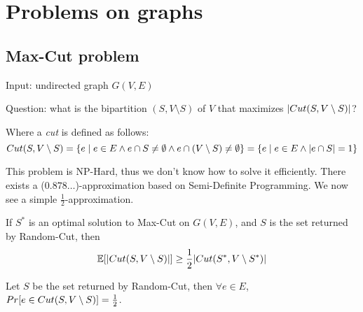 \section{Problems on graphs}\label{sec:problems_graphs}

\def\cut{Cut(S, V \setminus S)}
\subsection{Max-Cut problem}\label{subsec:maxcut}
    Input: undirected graph $G(V,E)$

    Question: what is the bipartition $(S, V \setminus S)$ of $V$ that maximizes $\cardinality{\cut}$?

    Where a \textit{cut} is defined as follows:
    \[ \cut = \{ e \st e \in E \wedge e \cap S \neq \emptyset \wedge e \cap (V \setminus S) \neq \emptyset \} = \{ e \st e \in E \wedge \cardinality{e \cap S} = 1 \}\]

    This problem is NP-Hard, thus we don't know how to solve it efficiently.
    There exists a ($0.878\dots$)-approximation based on Semi-Definite Programming. We now see a simple $\frac{1}{2}$-approximation.

    


    \begin{theorem}\label{thm:randcut_approx}
        If $S^*$ is an optimal solution to Max-Cut on $G(V,E)$, and $S$ is the set returned by Random-Cut, then
        \[ \expected[ \cardinality{\cut} ] \geq \frac{1}{2} \cardinality{Cut(S^*, V \setminus S^*)} \]
    \end{theorem}

    \begin{lemma}\label{lemma:randcut_1}
        Let $S$ be the set returned by Random-Cut, then $\forall e \in E$, $\prob[ e \in \cut] = \frac{1}{2}$.
    \end{lemma}

